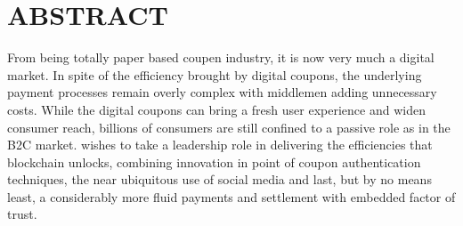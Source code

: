 \chapter*{\rm \large \bf ABSTRACT}
\vspace{4.0mm}
\setlength{\parindent}{4em}

\par
From being totally paper based coupen industry, it is now very much a digital market. In spite of the efficiency brought by digital coupons, the underlying payment processes remain overly complex with middlemen adding unnecessary costs. While the digital coupons can bring a fresh user experience and widen consumer reach, billions of consumers are still confined to a passive role as in the B2C market. wishes to take a leadership role in delivering the efficiencies that blockchain unlocks, combining innovation in point of coupon authentication techniques, the near ubiquitous use of social media and last, but by no means least, a considerably more fluid payments and settlement with embedded factor of trust.

\newpage 
